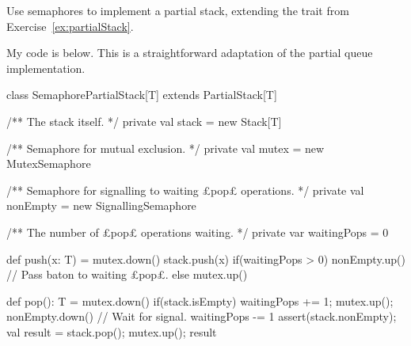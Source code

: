 \begin{questionS}
Use semaphores to implement a partial stack, extending the trait from
Exercise~\ref{ex:partialStack}. 
\end{questionS}


\begin{answerS}
My code is below.  This is a straightforward adaptation of the partial queue
implementation.
%
\begin{scala}
class SemaphorePartialStack[T] extends PartialStack[T]{
  /** The stack itself. */
  private val stack = new Stack[T]

  /** Semaphore for mutual exclusion. */
  private val mutex = new MutexSemaphore

  /** Semaphore for signalling to waiting £pop£ operations. */
  private val nonEmpty = new SignallingSemaphore

  /** The number of £pop£ operations waiting. */
  private var waitingPops = 0

  def push(x: T) = {
    mutex.down()
    stack.push(x)
    if(waitingPops > 0) nonEmpty.up() // Pass baton to waiting £pop£.
    else mutex.up()
  }

  def pop(): T = {
    mutex.down()
    if(stack.isEmpty){ 
      waitingPops += 1; mutex.up(); nonEmpty.down()  // Wait for signal.
      waitingPops -= 1
    }
    assert(stack.nonEmpty); val result = stack.pop(); mutex.up(); result
  }
}
\end{scala}
\end{answerS}
